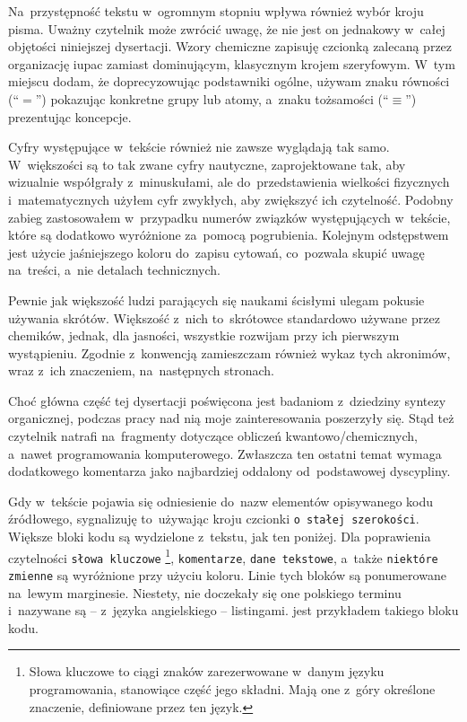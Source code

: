 Na~przystępność tekstu w~ogromnym stopniu wpływa również wybór kroju pisma.
Uważny czytelnik może zwrócić uwagę, że nie jest on jednakowy w~całej objętości
  niniejszej dysertacji.
Wzory chemiczne zapisuję czcionką zalecaną przez organizację \gls{iupac}
  zamiast dominującym, klasycznym krojem szeryfowym.
W~tym miejscu dodam, że doprecyzowując podstawniki ogólne,
  używam znaku równości (\enquote{$=$}) pokazując konkretne grupy lub atomy,
  a~znaku tożsamości (\enquote{$\equiv$}) prezentując koncepcje.

Cyfry występujące w~tekście również nie zawsze wyglądają tak samo.
W~większości są to tak zwane cyfry nautyczne, zaprojektowane tak, aby wizualnie współgrały
  z~minuskułami,
  ale do~przedstawienia wielkości fizycznych i~matematycznych użyłem cyfr zwykłych,
  aby zwiększyć ich czytelność.
Podobny zabieg zastosowałem w~przypadku numerów związków występujących w~tekście,
  które są dodatkowo wyróżnione za~pomocą pogrubienia.
Kolejnym odstępstwem jest użycie jaśniejszego koloru do~zapisu cytowań,
  co~pozwala skupić uwagę na~treści, a~nie detalach technicznych.

Pewnie jak większość ludzi parających się naukami ścisłymi ulegam pokusie używania skrótów.
Większość z~nich to~skrótowce standardowo używane przez chemików,
  jednak, dla jasności, wszystkie rozwijam przy ich pierwszym wystąpieniu.
Zgodnie z~konwencją zamieszczam również wykaz tych akronimów,
  wraz z~ich znaczeniem, na~następnych stronach.

Choć główna część tej dysertacji poświęcona jest badaniom z~dziedziny syntezy organicznej,
  podczas pracy nad nią moje zainteresowania poszerzyły się.
Stąd też czytelnik natrafi na~fragmenty dotyczące obliczeń kwantowo\-/chemicznych,
  a~nawet programowania komputerowego.
Zwłaszcza ten ostatni temat wymaga dodatkowego komentarza jako najbardziej oddalony
  od~podstawowej dyscypliny.

Gdy w~tekście pojawia się odniesienie do~nazw elementów opisywanego kodu źródłowego,
  sygnalizuję to~używając kroju czcionki \lstinline!o stałej szerokości!.
Większe bloki kodu są wydzielone z~tekstu, jak ten poniżej.
Dla poprawienia czytelności 
  \lstinline[basicstyle=\ttfamily\color{wongvermillion},columns=fixed]!słowa kluczowe!%
  \footnote{
    Słowa kluczowe to ciągi znaków zarezerwowane w~danym języku programowania,
      stanowiące część jego składni.
    Mają one z~góry określone znaczenie, definiowane przez ten język.
  },
  \lstinline[basicstyle=\ttfamily\color{wongsky},columns=fixed]!komentarze!,
  \lstinline[basicstyle=\ttfamily\color{wonggreen},columns=fixed]!dane tekstowe!, a~także
  \lstinline[basicstyle=\ttfamily\color{wongpurple},columns=fixed]!niektóre zmienne!
  są wyróżnione przy użyciu koloru.
Linie tych bloków są ponumerowane na~lewym marginesie.
Niestety, nie doczekały się one polskiego terminu i~nazywane są \--- 
  z~języka angielskiego \--- listingami.
 jest przykładem takiego bloku kodu.

